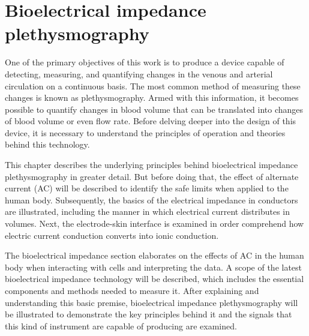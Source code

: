 
\chapter{Bioelectrical impedance plethysmography}  %
\label{chapter impedance}

\ifpdf
    \graphicspath{{Chapter3/Figs/Raster/}{Chapter3/Figs/PDF/}{Chapter3/Figs/}}
\else
    \graphicspath{{Chapter3/Figs/Vector/}{Chapter3/Figs/}}
\fi

One of the primary objectives of this work is to produce a device capable of detecting, measuring, and quantifying changes in the venous and arterial circulation on a continuous basis. The most common method of measuring these changes is known as plethysmography. Armed with this information, it becomes possible to quantify changes in blood volume that can be translated into changes of blood volume or even flow rate.  Before delving deeper into the design of this device, it is necessary to understand the principles of operation and theories behind this technology. 

This chapter describes the underlying principles behind bioelectrical impedance plethysmography in greater detail. But before doing that, the effect of alternate current (AC) will be described to identify the safe limits when applied to the human body. Subsequently, the basics of the electrical impedance in conductors are illustrated, including the manner in which electrical current distributes in volumes. Next, the electrode-skin interface is examined in order comprehend how electric current conduction converts into ionic conduction. 

The bioelectrical impedance section elaborates on the effects of AC in the human body when interacting with cells and interpreting the data. A scope of the latest bioelectrical impedance technology will be described, which includes the essential components and methods needed to measure it. After explaining and understanding this basic premise, bioelectrical impedance plethysmography will be illustrated to demonstrate the key principles behind it and the signals that this kind of instrument are capable of producing are examined.  

